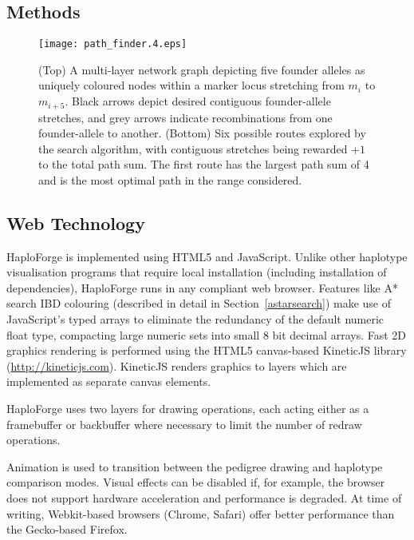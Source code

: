 \documentclass{bioinfo}
\numberwithin{equation}{section}
\def\haplo{{HaploForge}}
\begin{document}
\begin{methods}

\section{Methods}

\begin{figure}[!tpb]
	\centerline{\texttt{[image: path\_finder.4.eps]}}\caption{(Top) A multi-layer network graph depicting five founder alleles as uniquely coloured nodes within a marker locus stretching from $m_i$ to $m_{i+5}$. Black arrows depict desired contiguous founder-allele stretches, and grey arrows indicate recombinations from one founder-allele to another. (Bottom) Six possible routes explored by the search algorithm, with contiguous stretches being rewarded $+1$ to the total path sum. The first route has the largest path sum of 4 and is the most optimal path in the range considered.}\label{fig:pathfind}
\end{figure}


\subsection{Web Technology}

\haplo{} is implemented using HTML5 and JavaScript. Unlike other haplotype visualisation programs that require local installation (including installation of dependencies), \haplo{} runs in any compliant web browser. Features like A* search IBD colouring (described in detail in Section~\ref{astarsearch}) make use of JavaScript's typed arrays to eliminate the redundancy of the default numeric float type, compacting large numeric sets into small 8 bit decimal arrays. Fast 2D graphics rendering is performed using the HTML5 canvas-based {KineticJS library (\url{http://kineticjs.com})}. KineticJS renders graphics to layers which are implemented as separate canvas elements. 

\enlargethispage{0.5cm}

\haplo{} uses two layers for drawing operations, each acting either as a framebuffer or backbuffer where necessary to limit the number of redraw operations.

Animation is used to transition between the pedigree drawing and haplotype comparison modes. Visual effects can be disabled if, for example, the browser does not support hardware acceleration and performance is degraded. At time of writing, Webkit-based browsers (Chrome, Safari) offer better performance than the Gecko-based Firefox.


\end{methods}
\end{document}
